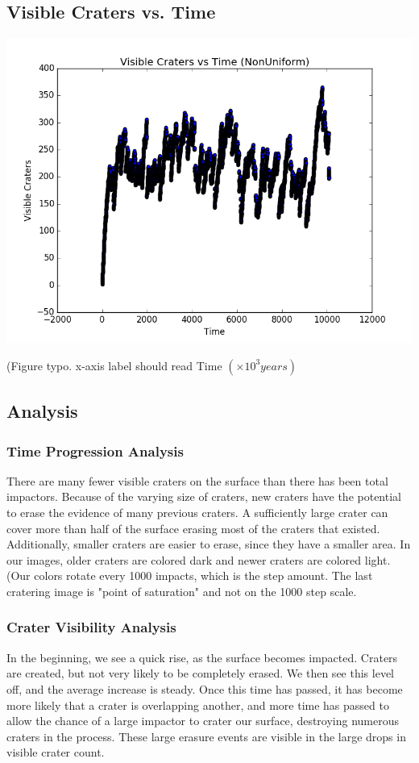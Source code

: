 \documentclass[11pt]{article}
\begin{document}
\subsection{Visible Craters vs. Time}
\includegraphics[scale=.85]{VisibleCratersvsTimeNonUniform.png}
\begin{center}
(Figure typo. x-axis label should read Time \( \left( \times 10^3 years \right) \)
\end{center}
\subsection{Analysis}

\subsubsection{Time Progression Analysis}
There are many fewer visible craters on the surface than there has been total impactors. Because of the varying size of craters, new craters have the potential to erase the evidence of many previous craters. A sufficiently large crater can cover more than half of the surface erasing most of the craters that existed. Additionally, smaller craters are easier to erase, since they have a smaller area. In our images, older craters are colored dark and newer craters are colored light. (Our colors rotate every 1000 impacts, which is the step amount. The last cratering image is "point of saturation" and not on the 1000 step scale. 
\subsubsection{Crater Visibility Analysis}
In the beginning, we see a quick rise, as the surface becomes impacted. Craters are created, but not very likely to be completely erased. We then see this level off, and the average increase is steady. Once this time has passed,  it has become more likely that a crater is overlapping another, and more time has passed to allow the chance of a large impactor to crater our surface, destroying numerous craters in the process. These large erasure events are visible in the large drops in visible crater count.
\end{document}
